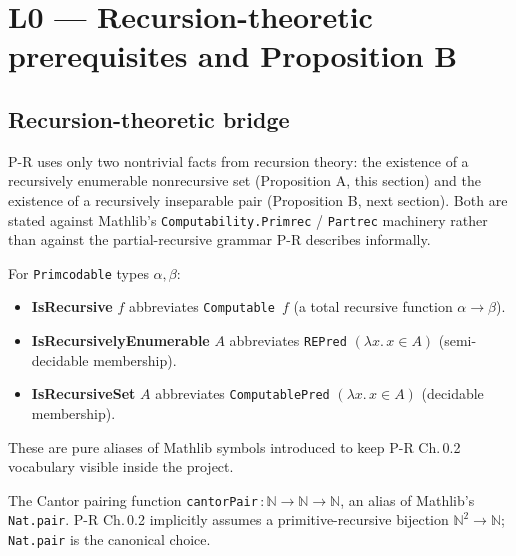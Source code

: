 \chapter{L0 — Recursion-theoretic prerequisites and Proposition B}


\section{Recursion-theoretic bridge}

P-R uses only two nontrivial facts from recursion theory: the existence of a
recursively enumerable nonrecursive set (Proposition A, this section) and the
existence of a recursively inseparable pair (Proposition B, next section). Both
are stated against Mathlib's \texttt{Computability.Primrec} / \texttt{Partrec}
machinery rather than against the partial-recursive grammar P-R describes
informally.

\begin{definition}
  \label{def:isRecursive}
  \leanok
  For \texttt{Primcodable} types $\alpha, \beta$:
  \begin{itemize}
    \item \textbf{IsRecursive} $f$ abbreviates \texttt{Computable}~$f$ (a total recursive function $\alpha \to \beta$).
    \item \textbf{IsRecursivelyEnumerable} $A$ abbreviates \texttt{REPred} $(\lambda x.\,x \in A)$ (semi-decidable membership).
    \item \textbf{IsRecursiveSet} $A$ abbreviates \texttt{ComputablePred} $(\lambda x.\,x \in A)$ (decidable membership).
  \end{itemize}
  These are pure aliases of Mathlib symbols introduced to keep P-R Ch.\,0.2 vocabulary visible inside the project.
\end{definition}

\begin{definition}
  \label{def:cantorPair}
  \leanok
  The Cantor pairing function \texttt{cantorPair}\,$: \mathbb{N} \to \mathbb{N} \to \mathbb{N}$, an alias of Mathlib's \texttt{Nat.pair}. P-R Ch.\,0.2 implicitly assumes a primitive-recursive bijection $\mathbb{N}^2 \to \mathbb{N}$; \texttt{Nat.pair} is the canonical choice.
\end{definition}

